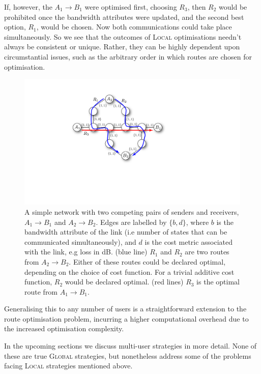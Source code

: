 \documentclass[aps,rmp,twocolumn,amsmath,amssymb,nofootinbib,superscriptaddress,longbibliography,floatfix,table-of-contents,eqsecnum]{revtex4-1}
\begin{document}
If, however, the \mbox{$A_1\to B_1$} were optimised first, choosing $R_3$, then $R_2$ would be prohibited once the bandwidth attributes were updated, and the second best option, $R_1$, would be chosen. Now both communications could take place simultaneously. So we see that the outcomes of \textsc{Local} optimisations needn't always be consistent or unique. Rather, they can be highly dependent upon circumstantial issues, such as the arbitrary order in which routes are chosen for optimisation.

\begin{figure}[!htb]
\includegraphics[width=\columnwidth]{conflict}
\caption{A simple network with two competing pairs of senders and receivers, \mbox{$A_1\to B_1$} and \mbox{$A_2\to B_2$}. Edges are labelled by \mbox{$\{b,d\}$}, where $b$ is the bandwidth attribute of the link (i.e number of states that can be communicated simultaneously), and $d$ is the cost metric associated with the link, e.g loss in dB. (blue line) $R_1$ and $R_2$ are two routes from $A_2\to B_2$. Either of these routes could be declared optimal, depending on the choice of cost function. For a trivial additive cost function, $R_2$ would be declared optimal. (red lines) $R_3$ is the optimal route from \mbox{$A_1\to B_1$}.} \label{fig:conflict}
\end{figure}

Generalising this to any number of users is a straightforward extension to the route optimisation problem, incurring a higher computational overhead due to the increased optimisation complexity.

In the upcoming sections we discuss multi-user strategies in more detail. None of these are true \textsc{Global} strategies, but nonetheless address some of the problems facing \textsc{Local} strategies mentioned above.
\end{document}
